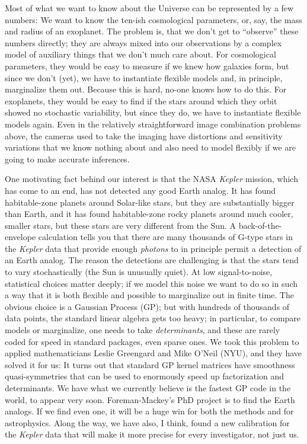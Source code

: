 \documentclass[11pt, letterpaper]{article}
\begin{document}
Most of what we want to know about the Universe can be represented by a few numbers:
We want to know the ten-ish cosmological parameters, or, say, the mass and radius of an exoplanet.
The problem is, that we don't get to ``observe'' these numbers directly;
  they are always mixed into our observations by a complex model of auxiliary things that we don't much care about.
For cosmological parameters, they would be easy to measure if we knew how galaxies form,
  but since we don't (yet), we have to instantiate flexible models and, in principle, marginalize them out.
Because this is hard, no-one knows how to do this.
For exoplanets, they would be easy to find if the stars around which they orbit showed no stochastic variability,
  but since they do, we have to instantiate flexible models again.
Even in the relatively straightforward image combination problems above,
  the cameras used to take the imaging have distortions and sensitivity variations
  that we know nothing about and also need to model flexibly if we are going to make accurate inferences.

One motivating fact behind our interest is that the NASA \textsl{Kepler} mission, which has come to an end,
  has not detected any good Earth analog.
It has found habitable-zone planets around Solar-like stars,
  but they are substantially bigger than Earth,
  and it has found habitable-zone rocky planets around much cooler, smaller stars,
  but these stars are very different from the Sun.
A back-of-the-envelope calculation tells you that there are many thousands of G-type stars in the \textsl{Kepler}
  data that provide enough \emph{photons} to in principle permit a detection of an Earth analog.
The reason the detections are challenging is that the stars tend to vary stochastically (the Sun is unusually quiet).
At low signal-to-noise, statistical choices matter deeply;
  if we model this noise we want to do so in such a way that it is both flexible and possible to marginalize out in finite time.
The obvious choice is a Gaussian Process (GP); but with hundreds of thousands of data points,
  the standard linear algebra gets too heavy; in particular, to compare models or marginalize, one needs to take \emph{determinants},
  and these are rarely coded for speed in standard packages, even sparse ones.
We took this problem to applied mathematicians Leslie Greengard and Mike O'Neil (NYU),
  and they have solved it for us: 
It turns out that standard GP kernel matrices have smoothness quasi-symmetries that can be used to enormously speed up
  factorization and determinants.
We have what we currently believe is the fastest GP code in the world, to appear very soon.
Foreman-Mackey's PhD project is to find the Earth analogs.
If we find even one, it will be a huge win for both the methods and for astrophysics.
Along the way, we have also, I think, found a new calibration for the \textsl{Kepler} data that will make
  it more precise for every investigator, not just us.
\end{document}

